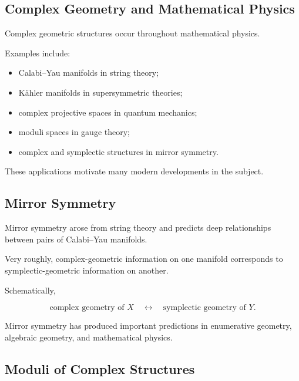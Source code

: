 \subsection{Complex Geometry and Mathematical Physics}
\label{subsec:complex-geometry-physics}

Complex geometric structures occur throughout mathematical physics.

Examples include:

\begin{itemize}
    \item Calabi--Yau manifolds in string theory;
    \item K\"ahler manifolds in supersymmetric theories;
    \item complex projective spaces in quantum mechanics;
    \item moduli spaces in gauge theory;
    \item complex and symplectic structures in mirror symmetry.
\end{itemize}

These applications motivate many modern developments in the subject.

\subsection{Mirror Symmetry}
\label{subsec:mirror-symmetry-preview}

Mirror symmetry arose from string theory and predicts deep relationships
between pairs of Calabi--Yau manifolds.

Very roughly, complex-geometric information on one manifold corresponds to
symplectic-geometric information on another.

Schematically,

\[
\boxed{
\text{complex geometry of }X
\quad\longleftrightarrow\quad
\text{symplectic geometry of }Y.
}
\]

Mirror symmetry has produced important predictions in enumerative geometry,
algebraic geometry, and mathematical physics.

\subsection{Moduli of Complex Structures}
\label{subsec:moduli-complex-structures}

